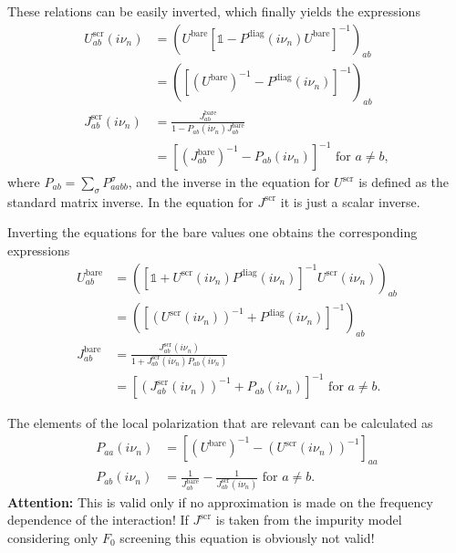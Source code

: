 \documentclass[12pt,a4paper]{scrartcl}
\numberwithin{equation}{section}
\newcommand{\unity}{\mathds{1}}
\begin{document}
These relations can be easily inverted, which finally yields the expressions
\begin{align}
 U^{\mathrm{scr}}_{ab}(i\nu_n) 
 &= \left( U^{\mathrm{bare}} \left[\unity -  P^{\mathrm{diag}}(i\nu_n) U^{\mathrm{bare}} \right]^{-1} \right)_{ab} \\
 &=  \left( \left[ \left(U^{\mathrm{bare}}\right)^{-1} -  P^{\mathrm{diag}}(i\nu_n) \right]^{-1} \right)_{ab} \\
 J^{\mathrm{scr}}_{ab}(i\nu_n) 
 &= \frac{ J^{\mathrm{bare}}_{ab} }{ 1 - P_{ab}(i\nu_n)J^{\mathrm{bare}}_{ab} }  \\
 &= \left[  \left(J^{\mathrm{bare}}_{ab} \right)^{-1} - P_{ab}(i\nu_n) \right]^{-1} \mbox{ for } a\neq b,
\end{align}
where  $P_{ab} = \sum_{\sigma} P^{\sigma}_{aabb}$, and the inverse in the equation for $U^{\mathrm{scr}}$
is defined as the standard matrix inverse. In the equation for $J^{\mathrm{scr}}$ it is just 
a scalar inverse.

Inverting the equations for the bare values one obtains the corresponding expressions
\begin{align}
 U^{\mathrm{bare}}_{ab}
 &= \left( \left[\unity + U^{\mathrm{scr}}(i\nu_n) P^{\mathrm{diag}}(i\nu_n) \right]^{-1} U^{\mathrm{scr}}(i\nu_n) \right)_{ab} \\
 &=  \left( \left[ \left(U^{\mathrm{scr}}(i\nu_n)\right)^{-1} +  P^{\mathrm{diag}}(i\nu_n) \right]^{-1} \right)_{ab} \\
 J^{\mathrm{bare}}_{ab} 
 &= \frac{ J^{\mathrm{scr}}_{ab}(i\nu_n) }{ 1 + J^{\mathrm{scr}}_{ab}(i\nu_n) P_{ab}(i\nu_n) } \\
 &= \left[  \left(J^{\mathrm{scr}}_{ab}(i\nu_n) \right)^{-1} + P_{ab}(i\nu_n) \right]^{-1} \mbox{ for } a\neq b.
\end{align}

The elements of the local polarization that are relevant can be 
calculated as
\begin{align}
 P_{aa}(i\nu_n)  
 &= \left[ \left(U^{\mathrm{bare}}\right)^{-1} - \left(U^{\mathrm{scr}}(i\nu_n)\right)^{-1} \right]_{aa} \\
%
 P_{ab}(i\nu_n) 
 &= \frac{1}{J^{\mathrm{bare}}_{ab}} - \frac{1}{J^{\mathrm{scr}}_{ab}(i\nu_n)} \mbox{ for } a\neq b.
\end{align}
\textbf{Attention:} This is valid only if no approximation is made on the frequency dependence
of the interaction! If $J^{\mathrm{scr}}$ is taken from the impurity model
considering only $F_0$ screening this equation is obviously not valid!
\end{document}
